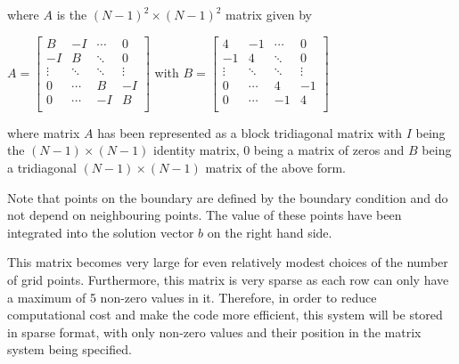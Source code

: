 \documentclass[12pt]{article}
\begin{document}
where $A$ is the $(N-1)^2 \times (N-1)^2$ matrix given by 

\begin{center}
	$A = \begin{bmatrix}
       B & -I  & \cdots  & 0  \\[0.3em]
       -I & B  &  \ddots & 0        \\[0.3em]
       \vdots & \ddots & \ddots & \vdots	 \\[0.3em]
       0 & \cdots 	& B & -I  \\[0.3em]
       0 & \cdots & -I 	& B   \\[0.3em]

	\end{bmatrix}$
	with 
	$B = \begin{bmatrix}
       4 & -1  & \cdots  & 0  \\[0.3em]
       -1 & 4  &  \ddots & 0        \\[0.3em]
       \vdots & \ddots & \ddots & \vdots	 \\[0.3em]
       0 & \cdots 	& 4 & -1  \\[0.3em]
       0 & \cdots & -1 	& 4   \\[0.3em]

	\end{bmatrix}$
\end{center}

where matrix $A$ has been represented as a block tridiagonal matrix with $I$ being the $(N-1) \times (N-1)$ identity matrix, $0$ being a matrix of zeros and $B$ being a tridiagonal $(N-1) \times (N-1)$ matrix of the above form. 

Note that points on the boundary are defined by the boundary condition and do not depend on neighbouring points. The value of these points have been integrated into the solution vector $b$ on the right hand side.

This matrix becomes very large for even relatively modest choices of the number of grid points. Furthermore, this matrix is very sparse as each row can only have a maximum of 5 non-zero values in it. Therefore, in order to reduce computational cost and make the code more efficient, this system will be stored in sparse format, with only non-zero values and their position in the matrix system being specified.
\end{document}
